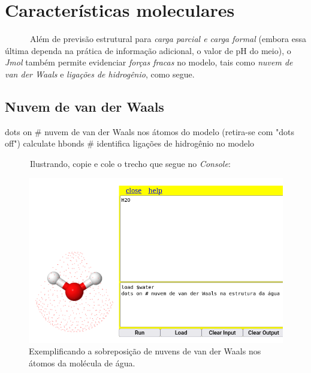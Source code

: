 \documentclass[
  letterpaper,
  DIV=11,
  numbers=noendperiod]{scrreprt}
\newenvironment{Shaded}{\begin{snugshade}}{\end{snugshade}}
\newcommand{\CommentTok}[1]{\textcolor[rgb]{0.37,0.37,0.37}{#1}}
\newcommand{\NormalTok}[1]{\textcolor[rgb]{0.00,0.23,0.31}{#1}}
\newcommand{\SpecialCharTok}[1]{\textcolor[rgb]{0.37,0.37,0.37}{#1}}
\begin{document}
\section{Características
moleculares}\label{caracteruxedsticas-moleculares-1}

~~~~~~Além de previsão estrutural para \emph{carga parcial e carga
formal} (embora essa última dependa na prática de informação adicional,
o valor de pH do meio), o \emph{Jmol} também permite evidenciar
\emph{forças fracas} no modelo, tais como \emph{nuvem de van der Waals}
e \emph{ligações de hidrogênio}, como segue.

\subsection{Nuvem de van der Waals}\label{nuvem-de-van-der-waals}

\begin{Shaded}
\begin{Highlighting}[]
\NormalTok{dots on }\CommentTok{\# nuvem de van der Waals nos átomos do modelo (retira{-}se com "dots off")}
\NormalTok{calculate hbonds }\CommentTok{\# identifica ligações de hidrogênio no modelo}
\end{Highlighting}
\end{Shaded}

~~~~~~Ilustrando, copie e cole o trecho que segue no \emph{Console}:

\begin{Shaded}
\end{Shaded}

\begin{figure}[H]

{\centering \includegraphics{vanderwaals.png}

}

\caption{Exemplificando a sobreposição de nuvens de van der Waals nos
átomos da molécula de água.}

\end{figure}%
\end{document}

